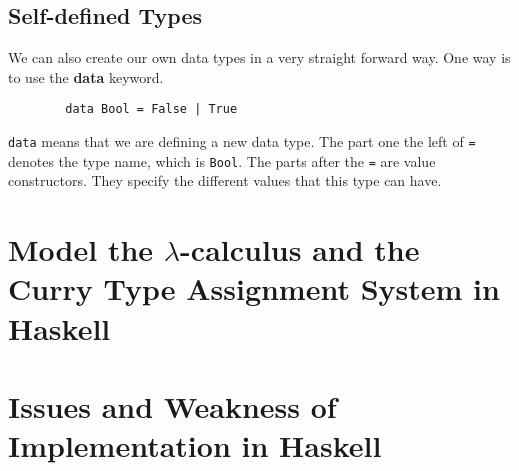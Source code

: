 \subsection{Self-defined Types}

We can also create our own data types in a very straight forward way. One way is to use the \textbf{data} keyword.

\begin{verbatim}
        data Bool = False | True
\end{verbatim} 

\verb|data| means that we are defining a new data type. The part one the left of \verb|=| denotes the type name, which is \verb|Bool|. The parts after the \verb|=| are value constructors. They specify the different values that this type can have. 



\section{Model the $\lambda$-calculus and the Curry Type Assignment System in Haskell}
\section{Issues and Weakness of Implementation in Haskell }

